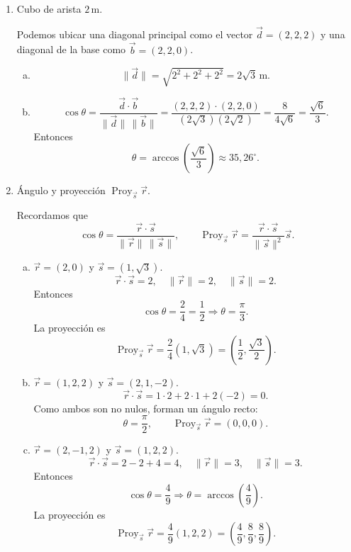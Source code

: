 \begin{enumerate}[\hspace{-3mm}$1)$]
\item Cubo de arista $2\,\text{m}$.
\begin{sol}
Podemos ubicar una diagonal principal como el vector $\vec d=(2,2,2)$ y una diagonal de la base como $\vec b=(2,2,0)$.
\begin{enumerate}[a)]
\item
\[
\|\vec d\|=\sqrt{2^2+2^2+2^2}=2\sqrt3\,\text{m}.
\]
\item
\[
\cos\theta=\frac{\vec d\cdot\vec b}{\|\vec d\|\,\|\vec b\|}
=\frac{(2,2,2)\cdot(2,2,0)}{(2\sqrt3)(2\sqrt2)}
=\frac{8}{4\sqrt6}=\frac{\sqrt6}{3}.
\]
Entonces
\[
\theta=\arccos\left(\frac{\sqrt6}{3}\right)\approx35,26^\circ.
\]
\end{enumerate}
\end{sol}

\item Ángulo y proyección $\operatorname{Proy}_{\vec s}\vec r$.
\begin{sol}
Recordamos que
\[
\cos\theta=\frac{\vec r\cdot\vec s}{\|\vec r\|\,\|\vec s\|},\qquad
\operatorname{Proy}_{\vec s}\vec r=\frac{\vec r\cdot\vec s}{\|\vec s\|^2}\vec s.
\]
\begin{enumerate}[a)]
\item $\vec r=(2,0)$ y $\vec s=(1,\sqrt3)$.
\[
\vec r\cdot\vec s=2,\quad \|\vec r\|=2,\quad \|\vec s\|=2.
\]
Entonces
\[
\cos\theta=\frac{2}{4}=\frac12\Rightarrow \theta=\frac\pi3.
\]
La proyección es
\[
\operatorname{Proy}_{\vec s}\vec r=\frac{2}{4}(1,\sqrt3)=\left(\frac12,\frac{\sqrt3}{2}\right).
\]
\begin{center}
\end{center}
\item $\vec r=(1,2,2)$ y $\vec s=(2,1,-2)$.
\[
\vec r\cdot\vec s=1\cdot2+2\cdot1+2(-2)=0.
\]
Como ambos son no nulos, forman un ángulo recto:
\[
\theta=\frac\pi2,\qquad \operatorname{Proy}_{\vec s}\vec r=(0,0,0).
\]
\item $\vec r=(2,-1,2)$ y $\vec s=(1,2,2)$.
\[
\vec r\cdot\vec s=2-2+4=4,
\quad \|\vec r\|=3,
\quad \|\vec s\|=3.
\]
Entonces
\[
\cos\theta=\frac49\Rightarrow \theta=\arccos\left(\frac49\right).
\]
La proyección es
\[
\operatorname{Proy}_{\vec s}\vec r=\frac{4}{9}(1,2,2)=\left(\frac49,\frac89,\frac89\right).
\]
\end{enumerate}
\end{sol}


\end{enumerate}
